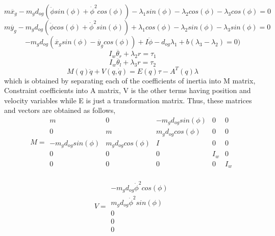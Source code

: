 \documentclass[12pt]{article}
\begin{document}
\[m\ddot{x_g}-m_gd_{og}(\ddot{\phi}sin(\phi)+{\dot{\phi}}^2cos(\phi))-\lambda_1sin(\phi)-\lambda_2cos(\phi)-\lambda_3cos(\phi)=0\]
\[m\ddot{y_g}-m_gd_{og}(\ddot{\phi}cos(\phi)+{\dot{\phi}}^2sin(\phi))+\lambda_1cos(\phi)-\lambda_2sin(\phi)-\lambda_3sin(\phi)=0\]
\[-m_gd_{og}(\ddot{x_g}sin(\phi)-\ddot{y_g}cos(\phi))+I\ddot{\phi}-d_{og}\lambda_1+b(\lambda_3-\lambda_2)=0)\]
\[I_w\ddot{\theta_r}+\lambda_2r=\tau_1\]
\[I_w\ddot{\theta_l}+\lambda_3r=\tau_2\]
\[M(q)\ddot{q}+V(q,\dot{q})=E(q)\tau-A^T(q)\lambda\]
which is obtained by separating each of the coefficients of inertia into M matrix, Constraint coefficients into A matrix, V is the other terms having position and velocity variables while E is just a transformation matrix. 
Thus, these matrices and vectors are obtained as follows, 
\begin{equation*}
M=
\begin{matrix}
m & 0 & -m_gd_{og}sin(\phi) & 0 & 0\\
0 & m & m_gd_{og}cos(\phi) & 0 & 0\\
-m_gd_{og}sin(\phi) & m_gd_{og}cos(\phi) & I & 0 & 0\\
0 & 0 & 0 & I_w & 0\\
0& 0& 0& 0 & I_w
\end{matrix}
\end{equation*}
\\
\begin{equation*}
V=
\begin{matrix}
-m_gd_{og}\dot{\phi}^2cos(\phi)\\
m_gd_{og}\dot{\phi}^2sin(\phi)\\
0\\
0\\
0
\end{matrix}
\end{equation*}
\end{document}
